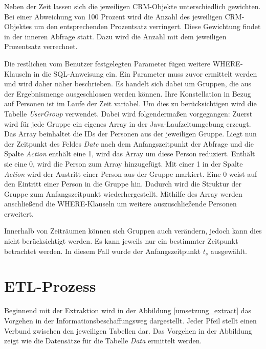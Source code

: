 Neben der Zeit lassen sich die jeweiligen CRM-Objekte unterschiedlich gewichten. Bei einer Abweichung von 100 Prozent wird die Anzahl des jeweiligen CRM-Objektes um den entsprechenden Prozentsatz verringert. Diese Gewichtung findet in der inneren Abfrage statt. Dazu wird die Anzahl mit dem jeweiligen Prozentsatz verrechnet.

Die restlichen vom Benutzer festgelegten Parameter fügen weitere WHERE-Klauseln in die SQL-Anweisung ein. Ein Parameter muss zuvor ermittelt werden und wird daher näher beschrieben. Es handelt sich dabei um Gruppen, die aus der Ergebnismenge ausgeschlossen werden können. Ihre Konstellation in Bezug auf Personen ist im Laufe der Zeit variabel. Um dies zu berücksichtigen wird die Tabelle \textit{UserGroup} verwendet. Dabei wird folgendermaßen vorgegangen: Zuerst wird für jede Gruppe ein eigenes Array in der Java-Laufzeitumgebung erzeugt. Das Array beinhaltet die IDs der Personen aus der jeweiligen Gruppe. Liegt nun der Zeitpunkt des Feldes \textit{Date} nach dem Anfangszeitpunkt der Abfrage und die Spalte \textit{Action} enthält eine 1, wird das Array um diese Person reduziert. Enthält sie eine 0, wird die Person zum Array hinzugefügt. Mit einer 1 in der Spalte \textit{Action} wird der Austritt einer Person aus der Gruppe markiert. Eine 0 weist auf den Eintritt einer Person in die Gruppe hin. Dadurch wird die Struktur der Gruppe zum Anfangszeitpunkt wiederhergestellt. Mithilfe des Array werden anschließend die WHERE-Klauseln um weitere auszuschließende Personen erweitert.

Innerhalb von Zeiträumen können sich Gruppen auch verändern, jedoch kann dies nicht berücksichtigt werden. Es kann jeweils nur ein bestimmter Zeitpunkt betrachtet werden. In diesem Fall wurde der Anfangszeitpunkt $t_{s}$ ausgewählt.

\section{ETL-Prozess}

Beginnend mit der Extraktion wird in der Abbildung \ref{umsetzung_extract} das Vorgehen in der Informationsbeschaffungsweg dargestellt. Jeder Pfeil stellt einen Verbund zwischen den jeweiligen Tabellen dar. Das Vorgehen in der Abbildung zeigt wie die Datensätze für die Tabelle \textit{Data} ermittelt werden. 

